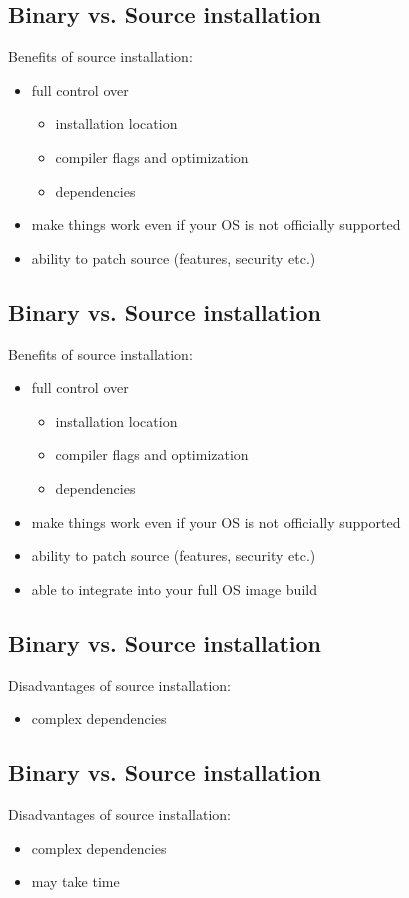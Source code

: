 \documentclass[xga]{xdvislides}
\begin{document}
\subsection{Binary vs. Source installation}
Benefits of source installation:
\begin{itemize}
	\item full control over
		\begin{itemize}
			\item installation location
			\item compiler flags and optimization
			\item dependencies
		\end{itemize}
	\item make things work even if your OS is not officially supported
	\item ability to patch source (features, security etc.)
\end{itemize}

\subsection{Binary vs. Source installation}
Benefits of source installation:
\begin{itemize}
	\item full control over
		\begin{itemize}
			\item installation location
			\item compiler flags and optimization
			\item dependencies
		\end{itemize}
	\item make things work even if your OS is not officially supported
	\item ability to patch source (features, security etc.)
	\item able to integrate into your full OS image build
\end{itemize}

\subsection{Binary vs. Source installation}
Disadvantages of source installation:
\begin{itemize}
	\item complex dependencies
\end{itemize}

\subsection{Binary vs. Source installation}
Disadvantages of source installation:
\begin{itemize}
	\item complex dependencies
	\item may take time
\end{itemize}
\end{document}
